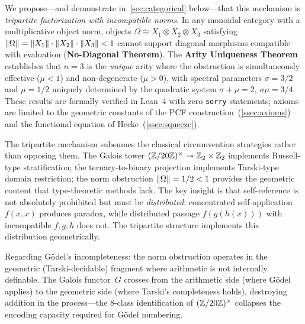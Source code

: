 We propose---and demonstrate in~\cref{sec:categorical}
below---that this mechanism is
\emph{tripartite factorization with incompatible norms}.  In any
monoidal category with a multiplicative object norm, objects
$\Omega \cong X_1 \otimes X_2 \otimes X_3$ satisfying
$\|\Omega\| = \|X_1\| \cdot \|X_2\| \cdot \|X_3\| < 1$
cannot support diagonal morphisms compatible with evaluation
(\textbf{No-Diagonal Theorem}).  The \textbf{Arity Uniqueness Theorem}
establishes that $n = 3$ is the \emph{unique} arity where the
obstruction is simultaneously effective ($\mu < 1$) and non-degenerate
($\mu > 0$), with spectral parameters $\sigma = 3/2$ and $\mu = 1/2$
uniquely determined by the quadratic system
$\sigma + \mu = 2$, $\sigma\mu = 3/4$.
These results are formally verified in Lean~4 with zero \texttt{sorry} statements; axioms are limited to the geometric constants of the PCF construction~(\cref{ssec:axioms}) and the functional equation of Hecke~(\cref{ssec:squeeze}).

The tripartite mechanism subsumes the classical circumvention
strategies rather than opposing them.  The Galois tower
$(\mathbb{Z}/20\mathbb{Z})^\times \twoheadrightarrow
\mathbb{Z}_2 \times \mathbb{Z}_2$ implements Russell-type
stratification; the ternary-to-binary projection implements Tarski-type
domain restriction; the norm obstruction $\|\Omega\| = 1/2 < 1$
provides the geometric content that type-theoretic methods lack.  The
key insight is that self-reference is not absolutely prohibited but must
be \emph{distributed}: concentrated self-application $f(x,x)$ produces
paradox, while distributed passage $f(g(h(x)))$ with incompatible
$f,g,h$ does not.  The tripartite structure implements this distribution
geometrically.

Regarding G\"odel's incompleteness: the norm obstruction operates in
the geometric (Tarski-decidable) fragment where arithmetic is not
internally definable.  The Galois functor~$G$ crosses from the
arithmetic side (where G\"odel applies) to the geometric side (where
Tarski's completeness holds), destroying addition in the process---the
8-class identification of $(\mathbb{Z}/20\mathbb{Z})^\times$ collapses the
encoding capacity required for G\"odel numbering.

\medskip

